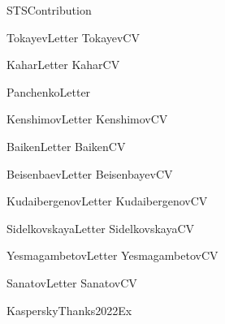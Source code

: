 \renewcommand\ExhibitGroup{Contributions}

{STSContribution}

{TokayevLetter}
{TokayevCV}

{KaharLetter}
{KaharCV}

{PanchenkoLetter}

{KenshimovLetter}
{KenshimovCV}

{BaikenLetter}
{BaikenCV}

{BeisenbaevLetter}
{BeisenbayevCV}

{KudaibergenovLetter}
{KudaibergenovCV}

{SidelkovskayaLetter}
{SidelkovskayaCV}

{YesmagambetovLetter}
{YesmagambetovCV}

{SanatovLetter}
{SanatovCV}

{KasperskyThanks2022Ex}